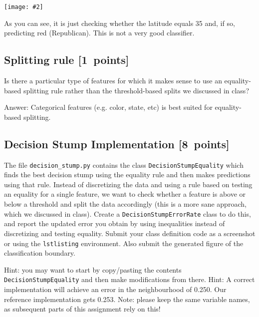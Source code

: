 \documentclass{article}
\newcommand{\blu}[1]{{\textcolor{blu}{#1}}}
\newcommand{\gre}[1]{\textcolor{gre}{#1}}
\newcommand\ans[1]{\par\gre{Answer: #1}}
\let\ask\blu
\newcommand\pts[1]{\textcolor{pointscolour}{[#1~points]}}
\newcommand{\centerfig}[2]{\begin{center}\texttt{[image: \#2]}\end{center}}
\begin{document}
  \centerfig{0.7}{./figs/q6_decisionBoundary}

  As you can see, it is just checking whether the latitude equals 35 and, if so, predicting red (Republican).
  This is not a very good classifier.

  \subsection{Splitting rule \pts{1}}

  Is there a particular type of features for which it makes sense to use an equality-based splitting rule rather than the threshold-based splits we discussed in class?
\ans{Categorical features (e.g. color, state, etc) is best suited for equality-based splitting. }
\newpage

  \subsection{Decision Stump Implementation \pts{8}}

  The file \texttt{decision\string_stump.py} contains the class \texttt{DecisionStumpEquality} which
  finds the best decision stump using the equality rule and then makes predictions using that
  rule. Instead of discretizing the data and using a rule based on testing an equality for
  a single feature, we want to check whether a feature is above or below a threshold and
  split the data accordingly (this is a more sane approach, which we discussed in class).
  \ask{Create a \texttt{DecisionStumpErrorRate} class to do this, and report the updated error you
  obtain by using inequalities instead of discretizing and testing equality. 
  Submit your class definition code as a screenshot or using the \texttt{lstlisting} environment.
  Also submit the generated figure of the classification boundary.}

  Hint: you may want to start by copy/pasting the contents \texttt{DecisionStumpEquality} and then make modifications from there. 
  Hint: A correct implementation will achieve an error in the neighbourhood of 0.250. Our reference implementation gets 0.253. 
  Note: please keep the same variable names, as subsequent parts of this assignment rely on this!
\end{document}
